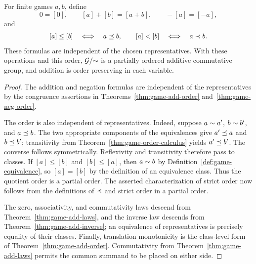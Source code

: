 \begin{theorem}
  \label{thm:game-quotient-ordered-add-group}
  \leanok
  For finite games \(a,b\), define
  \[
    0=[0],\qquad [a]+[b]=[a+b],\qquad -[a]=[-a],
  \]
  and
  \[
    [a]\leq[b]\quad\Longleftrightarrow\quad a\preceq b,
    \qquad
    [a]<[b]\quad\Longleftrightarrow\quad a\prec b.
  \]
  These formulas are independent of the chosen representatives.  With these operations and
  this order, \(\mathcal{G}/{\sim}\) is a partially ordered additive commutative group, and
  addition is order preserving in each variable.
\end{theorem}
\begin{proof}
  \leanok
  The addition and negation formulas are independent of the representatives by the
  congruence assertions in Theorems~\ref{thm:game-add-order}
  and~\ref{thm:game-neg-order}.

  The order is also independent of representatives.  Indeed, suppose
  \(a\sim a'\), \(b\sim b'\), and \(a\preceq b\).  The two appropriate
  components of the equivalences give \(a'\preceq a\) and
  \(b\preceq b'\); transitivity from
  Theorem~\ref{thm:game-order-calculus} yields \(a'\preceq b'\).  The converse
  follows symmetrically.  Reflexivity and transitivity therefore pass to
  classes.  If \([a]\leq[b]\) and \([b]\leq[a]\), then
  \(a\sim b\) by Definition~\ref{def:game-equivalence}, so \([a]=[b]\) by the
  definition of an equivalence class.  Thus the quotient order is a partial
  order.  The asserted characterization of strict order now follows from the
  definitions of \(\prec\) and strict order in a partial order.

  The zero, associativity, and commutativity laws descend from
  Theorem~\ref{thm:game-add-laws}, and the inverse law descends from
  Theorem~\ref{thm:game-add-inverse}; an equivalence of representatives is
  precisely equality of their classes.  Finally, translation monotonicity is
  the class-level form of Theorem~\ref{thm:game-add-order}.  Commutativity from
  Theorem~\ref{thm:game-add-laws} permits the common summand to be placed on
  either side.
\end{proof}

